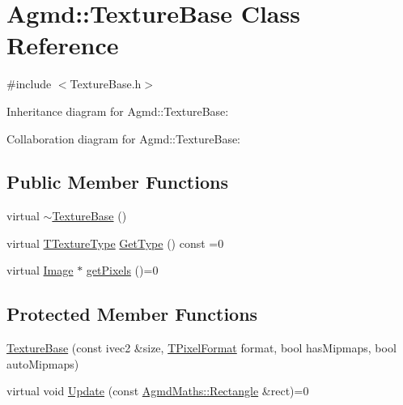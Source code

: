 \hypertarget{class_agmd_1_1_texture_base}{\section{Agmd\+:\+:Texture\+Base Class Reference}
\label{class_agmd_1_1_texture_base}
}


{\ttfamily \#include $<$Texture\+Base.\+h$>$}



Inheritance diagram for Agmd\+:\+:Texture\+Base\+:


Collaboration diagram for Agmd\+:\+:Texture\+Base\+:
\subsection*{Public Member Functions}
\begin{DoxyCompactItemize}
\item 
virtual \hyperlink{class_agmd_1_1_texture_base_a1056c402d6492e0987048228ec202759}{$\sim$\+Texture\+Base} ()
\item 
virtual \hyperlink{namespace_agmd_a7036bece09449a930cfec410f75e85f4}{T\+Texture\+Type} \hyperlink{class_agmd_1_1_texture_base_a09d3fb79e614d63ff8b1fe8ab9d7b087}{Get\+Type} () const =0
\item 
virtual \hyperlink{class_agmd_1_1_image}{Image} $\ast$ \hyperlink{class_agmd_1_1_texture_base_a1fddab81033407095a56833613aa53f7}{get\+Pixels} ()=0
\end{DoxyCompactItemize}
\subsection*{Protected Member Functions}
\begin{DoxyCompactItemize}
\item 
\hyperlink{class_agmd_1_1_texture_base_a44da6a4d051066875158bbe5ccfea222}{Texture\+Base} (const ivec2 \&size, \hyperlink{namespace_agmd_afc48fd9fa5dccb4c5621c052bfd1a7ec}{T\+Pixel\+Format} format, bool has\+Mipmaps, bool auto\+Mipmaps)
\item 
virtual void \hyperlink{class_agmd_1_1_texture_base_a71255f73d1d0cef7748db0e35f66df36}{Update} (const \hyperlink{class_agmd_maths_1_1_rectangle}{Agmd\+Maths\+::\+Rectangle} \&rect)=0
\end{DoxyCompactItemize}
